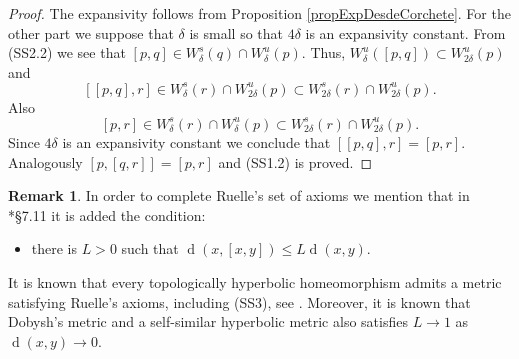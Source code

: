 \documentclass[12pt]{amsart}
\theoremstyle{plain}
\theoremstyle{definition}
\newtheorem{rmk}[thm]{Remark}
\theoremstyle{remark}
\DeclareMathOperator{\diam}{diam}
\DeclareMathOperator{\dist}{d}
\newcommand{\Z}{\mathbb Z}
\newcommand{\expc}{\xi}
\newcommand{\violeta}[1]{\textcolor{magenta}{#1}}
\begin{document}
\begin{proof}
	The expansivity follows from Proposition \ref{propExpDesdeCorchete}.
For the other part we suppose that $\delta$ is small so that $4\delta$ is  an expansivity constant.
	From (SS2.2) we see that $[p,q]\in W^s_\delta(q)\cap W^u_\delta(p)$.
	Thus, $W^u_{\delta}([p,q])\subset W^u_{2\delta}(p)$ and
	\[
	[[p,q],r]\in W^s_{\delta}(r)\cap W^u_{2\delta}(p)
	\subset W^s_{2\delta}(r)\cap W^u_{2\delta}(p).
	\]
	Also $$[p,r]\in W^s_{\delta}(r)\cap W^u_{\delta}(p)\subset
	W^s_{2\delta}(r)\cap W^u_{2\delta}(p).$$
	Since $4\delta$ is an expansivity constant we conclude that $[[p,q],r]=[p,r]$.
	Analogously $[p,[q,r]]=[p,r]$ and (SS1.2) is proved.
\end{proof}

\begin{rmk}
In order to complete Ruelle's set of axioms we mention that
in \cite{Ruelle}*{\S 7.11} it is added the condition:
\begin{itemize}
	\item[(SS3)] there is $L>0$ such that
	$\dist(x,[x,y])\leq L\dist(x,y)$.
\end{itemize}
It is known that every topologically hyperbolic homeomorphism admits a metric satisfying Ruelle's axioms, including (SS3), see \cites{Fried1983,Sakai2001}.
Moreover, it is known that Dobysh's metric \cite{Dovbysh2006} and a self-similar hyperbolic metric \cite{ArSelfSimHyp} also satisfies $L\to 1$ as $\dist(x,y)\to 0$.
\end{rmk}
\end{document}
